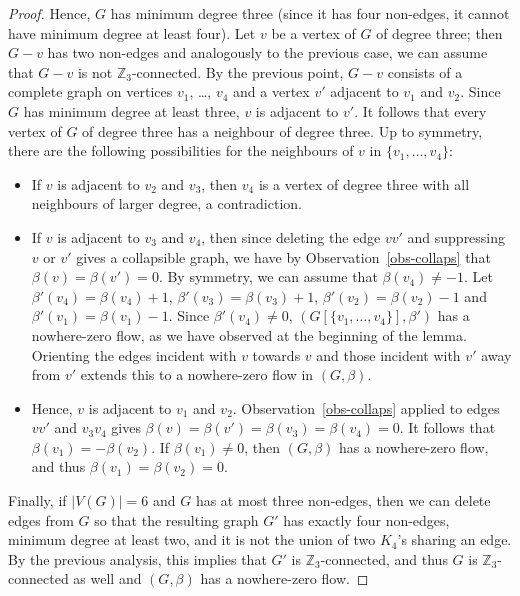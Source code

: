 \documentclass{article}
\newcommand{\Z}{\mathbb{Z}_3}
\begin{document}
\begin{proof}
Hence, $G$ has minimum degree three (since it has four non-edges, it cannot have minimum degree at least four).
Let $v$ be a vertex of $G$ of degree three; then $G-v$ has two non-edges and analogously to the previous case, we can assume that $G-v$ is not $\Z$-connected.
By the previous point,
$G-v$ consists of a complete graph on vertices $v_1$, \ldots, $v_4$ and a vertex $v'$ adjacent to $v_1$ and $v_2$.
Since $G$ has minimum degree at least three, $v$ is adjacent to $v'$.  It follows that every vertex of $G$ of degree three has a neighbour of degree three. Up to symmetry, there are the following possibilities for the neighbours of $v$ in $\{v_1,\ldots,v_4\}$:
\begin{itemize}
\item If $v$ is adjacent to $v_2$ and $v_3$, then $v_4$ is a vertex of degree three with all neighbours of larger degree, a contradiction.
\item If $v$ is adjacent to $v_3$ and $v_4$, then since deleting the edge $vv'$ and suppressing $v$ or $v'$ gives a collapsible graph,
we have by Observation~\ref{obs-collaps} that $\beta(v)=\beta(v')=0$.  By symmetry, we can assume that $\beta(v_4)\neq -1$.  Let $\beta'(v_4)=\beta(v_4)+1$, $\beta'(v_3)=\beta(v_3)+1$,
$\beta'(v_2)=\beta(v_2)-1$ and $\beta'(v_1)=\beta(v_1)-1$.  Since $\beta'(v_4)\neq 0$, $(G[\{v_1,\ldots,v_4\}],\beta')$ has a nowhere-zero flow,
as we have observed at the beginning of the lemma.  Orienting the edges incident with $v$ towards $v$ and those incident with $v'$ away from $v'$
extends this to a nowhere-zero flow in $(G,\beta)$.
\item Hence, $v$ is adjacent to $v_1$ and $v_2$.  Observation~\ref{obs-collaps} applied to edges $vv'$ and $v_3v_4$ gives $\beta(v)=\beta(v')=\beta(v_3)=\beta(v_4)=0$.
It follows that $\beta(v_1)=-\beta(v_2)$.  If $\beta(v_1)\neq 0$, then $(G,\beta)$ has a nowhere-zero flow, and thus $\beta(v_1)=\beta(v_2)=0$.
\end{itemize}
Finally, if $|V(G)|=6$ and $G$ has at most three non-edges, then we can delete edges from $G$ so that the resulting graph $G'$ has exactly four non-edges, minimum degree at least two,
and it is not the union of two $K_4$'s sharing an edge. By the previous analysis, this implies that $G'$ is $\Z$-connected, and thus $G$ is $\Z$-connected as well and $(G,\beta)$ has a nowhere-zero flow.
\end{proof}
\end{document}
